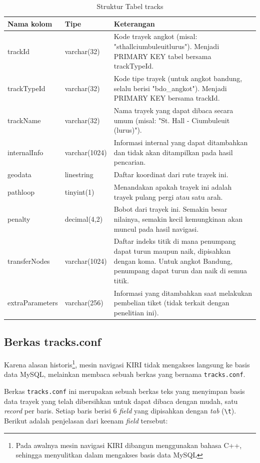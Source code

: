 \begin{table}
	\caption{Struktur Tabel tracks}
	\label{tab:2_struktur_tabel_tracks}
	\begin{tabular}{|p{3cm}|p{2.5cm}|p{9.5cm}|}
		\hline
		Nama kolom & Tipe & Keterangan \\
		\hline
		trackId & varchar(32) & Kode trayek angkot (misal: "sthallciumbuleuitlurus"). Menjadi PRIMARY KEY tabel bersama trackTypeId. \\
		trackTypeId & varchar(32) & Kode tipe trayek (untuk angkot bandung, selalu berisi "bdo\_angkot"). Menjadi PRIMARY KEY bersama trackId. \\
		trackName & varchar(32) & Nama trayek yang dapat dibaca secara umum (misal: "St. Hall - Ciumbuleuit (lurus)"). \\
		internalInfo & varchar(1024) & Informasi internal yang dapat ditambahkan dan tidak akan ditampilkan pada hasil pencarian. \\
		geodata & linestring & Daftar koordinat dari rute trayek ini. \\
		pathloop & tinyint(1) & Menandakan apakah trayek ini adalah trayek pulang pergi atau satu arah. \\
		penalty & decimal(4,2) & Bobot dari trayek ini. Semakin besar nilainya, semakin kecil kemungkinan akan muncul pada hasil navigasi. \\
		transferNodes & varchar(1024) & Daftar indeks titik di mana penumpang dapat turun maupun naik, dipisahkan dengan koma. Untuk angkot Bandung, penumpang dapat turun dan naik di semua titik. \\
		extraParameters & varchar(256) & Informasi yang ditambahkan saat melakukan pembelian tiket (tidak terkait dengan penelitian ini). \\
		\hline
	\end{tabular}
\end{table}

\subsection{Berkas tracks.conf}
Karena alasan historis\footnote{Pada awalnya mesin navigasi KIRI dibangun menggunakan bahasa C++, sehingga menyulitkan dalam mengakses basis data MySQL}, mesin navigasi KIRI tidak mengakses langsung ke basis data MySQL, melainkan membaca sebuah berkas yang bernama \verb/tracks.conf/.

Berkas \verb/tracks.conf/ ini merupakan sebuah berkas teks yang menyimpan basis data trayek yang telah dibersihkan untuk dapat dibaca dengan mudah, satu \textit{record} per baris. Setiap baris berisi 6 \textit{field} yang dipisahkan dengan \textit{tab} (\verb/\t/). Berikut adalah penjelasan dari keenam \textit{field} tersebut:

